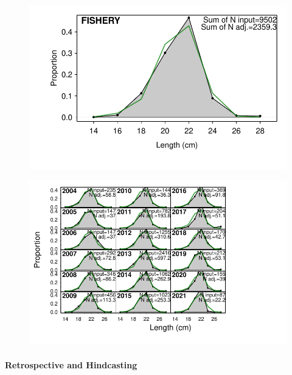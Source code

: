 \documentclass[
  letterpaper,
  DIV=11,
  numbers=noendperiod]{scrartcl}
\let\oldparagraph\paragraph
\renewcommand{\paragraph}[1]{\oldparagraph{#1}\mbox{}}
\begin{document}
\begin{figure}

{\centering \includegraphics{LUKA_50_Base_model_diags_report_files/figure-pdf/lencompfits-1.pdf}

}

\end{figure}

\begin{figure}

{\centering \includegraphics{LUKA_50_Base_model_diags_report_files/figure-pdf/lencompfits-2.pdf}

}

\end{figure}

\hypertarget{retrospective-and-hindcasting}{%
\paragraph{Retrospective and
Hindcasting}\label{retrospective-and-hindcasting}}
\end{document}
